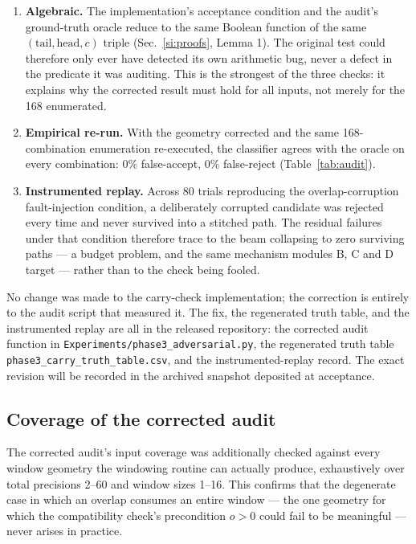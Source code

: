 \documentclass[preprint,11pt]{elsarticle}
\begin{document}
\begin{enumerate}\itemsep3pt
\item \textbf{Algebraic.} The implementation's acceptance condition and
the audit's ground-truth oracle reduce to the same Boolean function of
the same $(\mathrm{tail},\mathrm{head},c)$ triple
(Sec.~\ref{si:proofs}, Lemma 1). The original test could therefore only
ever have detected its own arithmetic bug, never a defect in the
predicate it was auditing. This is the strongest of the three checks: it
explains why the corrected result must hold for all inputs, not merely
for the 168 enumerated.
\item \textbf{Empirical re-run.} With the geometry corrected and the same
168-combination enumeration re-executed, the classifier agrees with the
oracle on every combination: 0\% false-accept, 0\% false-reject
(Table~\ref{tab:audit}).
\item \textbf{Instrumented replay.} Across 80 trials reproducing the
overlap-corruption fault-injection condition, a deliberately corrupted
candidate was rejected every time and never survived into a stitched
path. The residual failures under that condition therefore trace to the
beam collapsing to zero surviving paths --- a budget problem, and the
same mechanism modules B, C and D target --- rather than to the check
being fooled.
\end{enumerate}

No change was made to the carry-check implementation; the correction is
entirely to the audit script that measured it. The fix, the regenerated
truth table, and the instrumented replay are all in the released
repository: the corrected audit function in
\texttt{Experiments/phase3\_adversarial.py}, the regenerated truth table
\texttt{phase3\_carry\_truth\_table.csv}, and the instrumented-replay
record. The exact revision will be recorded in the archived snapshot
deposited at acceptance.

\subsection{Coverage of the corrected audit}

The corrected audit's input coverage was additionally checked against
every window geometry the windowing routine can actually produce,
exhaustively over total precisions 2--60 and window sizes 1--16. This
confirms that the degenerate case in which an overlap consumes an entire
window --- the one geometry for which the compatibility check's
precondition $o>0$ could fail to be meaningful --- never arises in
practice.
\end{document}
